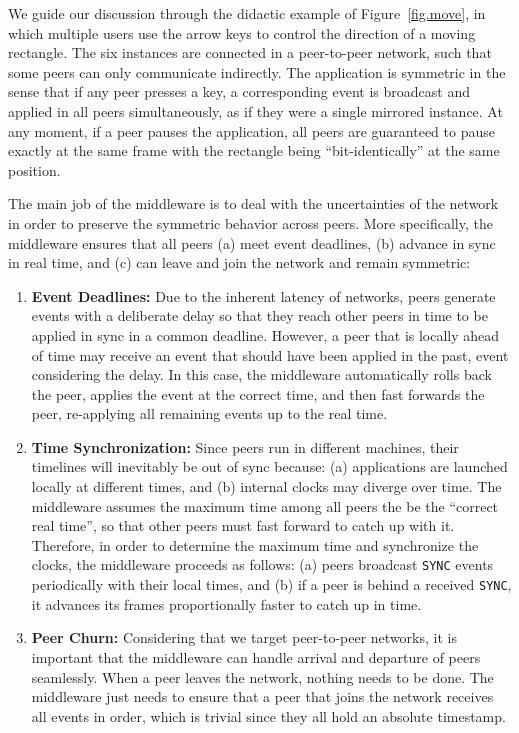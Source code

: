 \documentclass[10pt,journal,compsoc]{IEEEtran}
\newcommand{\code}[1]  {\texttt{\footnotesize{#1}}}
\begin{document}
We guide our discussion through the didactic example of Figure~\ref{fig.move},
in which multiple users use the arrow keys to control the direction of a
moving rectangle.
The six instances are connected in a peer-to-peer network, such that some
peers can only communicate indirectly.
%
The application is symmetric in the sense that if any peer presses a key, a
corresponding event is broadcast and applied in all peers simultaneously, as
if they were a single mirrored instance.
At any moment, if a peer pauses the application, all peers are guaranteed to
pause exactly at the same frame with the rectangle being ``bit-identically'' at
the same position.

The main job of the middleware is to deal with the uncertainties of the
network in order to preserve the symmetric behavior across peers.
More specifically, the middleware ensures that all peers
    (a) meet event deadlines,
    (b) advance in sync in real time, and
    (c) can leave and join the network and remain symmetric:
%
\begin{enumerate}
\item \textbf{Event Deadlines:}
Due to the inherent latency of networks, peers generate events with a
deliberate delay so that they reach other peers in time to be applied in sync
in a common deadline.
However, a peer that is locally ahead of time may receive an event that should
have been applied in the past, event considering the delay.
In this case, the middleware automatically rolls back the peer, applies the
event at the correct time, and then fast forwards the peer, re-applying all
remaining events up to the real time.
%
\item \textbf{Time Synchronization:}
Since peers run in different machines, their timelines will inevitably be out
of sync because:
    (a) applications are launched locally at different times, and
    (b) internal clocks may diverge over time.
The middleware assumes the maximum time among all peers the be the
``correct real time'', so that other peers must fast forward to catch up with
it.
Therefore, in order to determine the maximum time and synchronize the clocks,
the middleware proceeds as follows:
    (a) peers broadcast \code{SYNC} events periodically with their local
        times, and
    (b) if a peer is behind a received \code{SYNC}, it advances its frames
        proportionally faster to catch up in time.
%
\item \textbf{Peer Churn:}
Considering that we target peer-to-peer networks, it is important that the
middleware can handle arrival and departure of peers seamlessly.
When a peer leaves the network, nothing needs to be done.
The middleware just needs to ensure that a peer that joins the network receives
all events in order, which is trivial since they all hold an absolute
timestamp.
\end{enumerate}
\end{document}
